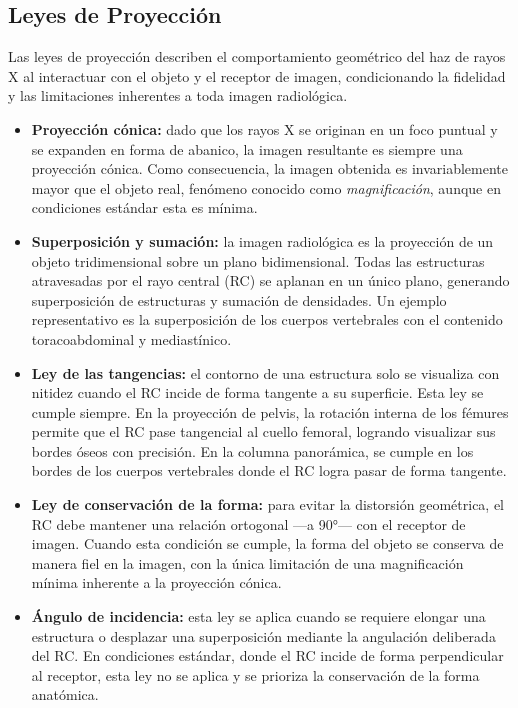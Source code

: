 \clearpage

\subsection*{Leyes de Proyección}

Las leyes de proyección describen el comportamiento geométrico del haz de rayos X
al interactuar con el objeto y el receptor de imagen, condicionando la fidelidad
y las limitaciones inherentes a toda imagen radiológica.

\begin{itemize}
    \item \textbf{Proyección cónica:} dado que los rayos X se originan en un foco
    puntual y se expanden en forma de abanico, la imagen resultante es siempre una
    proyección cónica. Como consecuencia, la imagen obtenida es invariablemente
    mayor que el objeto real, fenómeno conocido como \textit{magnificación}, aunque
    en condiciones estándar esta es mínima.

    \item \textbf{Superposición y sumación:} la imagen radiológica es la proyección
    de un objeto tridimensional sobre un plano bidimensional. Todas las estructuras
    atravesadas por el rayo central (RC) se aplanan en un único plano, generando
    superposición de estructuras y sumación de densidades. Un ejemplo representativo
    es la superposición de los cuerpos vertebrales con el contenido
    toracoabdominal y mediastínico.

    \item \textbf{Ley de las tangencias:} el contorno de una estructura solo se
    visualiza con nitidez cuando el RC incide de forma tangente a su superficie.
    Esta ley se cumple siempre. En la proyección de pelvis, la rotación interna de
    los fémures permite que el RC pase tangencial al cuello femoral, logrando
    visualizar sus bordes óseos con precisión. En la columna panorámica, se cumple
    en los bordes de los cuerpos vertebrales donde el RC logra pasar de forma
    tangente.

    \item \textbf{Ley de conservación de la forma:} para evitar la distorsión
    geométrica, el RC debe mantener una relación ortogonal ---a 90°--- con el
    receptor de imagen. Cuando esta condición se cumple, la forma del objeto se
    conserva de manera fiel en la imagen, con la única limitación de una
    magnificación mínima inherente a la proyección cónica.

    \item \textbf{Ángulo de incidencia:} esta ley se aplica cuando se requiere
    elongar una estructura o desplazar una superposición mediante la angulación
    deliberada del RC. En condiciones estándar, donde el RC incide de forma
    perpendicular al receptor, esta ley no se aplica y se prioriza la conservación
    de la forma anatómica.
\end{itemize}

